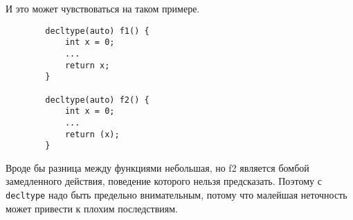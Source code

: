 		И это может чувствоваться на таком примере.
\begin{verbatim}
		decltype(auto) f1() {
			int x = 0;
			...
			return x;
		}
		
		decltype(auto) f2() {
			int x = 0;
			...
			return (x);
		}
\end{verbatim}
		Вроде бы разница между функциями небольшая, но f2 является бомбой замедленного действия, поведение которого нельзя предсказать. Поэтому с \texttt{decltype} надо быть предельно внимательным, потому что малейшая неточность может привести к плохим последствиям.
